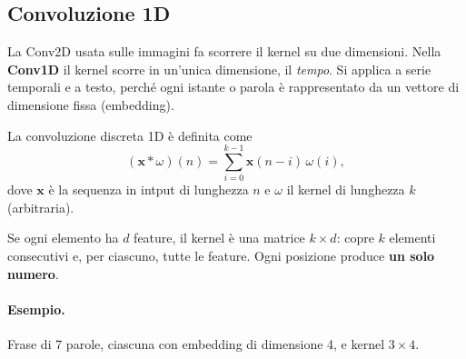 \documentclass[11pt,a4paper]{article}
\begin{document}
\subsection{Convoluzione 1D}

La Conv2D usata sulle immagini fa scorrere il kernel su due dimensioni. Nella \textbf{Conv1D} il kernel scorre in un'unica dimensione,
 il \textit{tempo}. Si applica a serie temporali e a testo, perché ogni istante o parola è rappresentato da un vettore 
di dimensione fissa (embedding).

La convoluzione discreta 1D è definita come
\[
(\mathbf{x} * \omega)(n) = \sum_{i=0}^{k-1} \mathbf{x}(n-i)\,\omega(i),
\]
dove $\mathbf{x}$ è la sequenza in intput di lunghezza $n$ e $\omega$ il kernel di lunghezza $k$(arbitraria).

Se ogni elemento ha $d$ feature, il kernel è una matrice $k \times d$: copre $k$ elementi consecutivi e, per ciascuno, tutte le feature. 
Ogni posizione produce \textbf{un solo numero}.

\paragraph{Esempio.} Frase di 7 parole, ciascuna con embedding di dimensione 4, e kernel $3 \times 4$.
\end{document}
